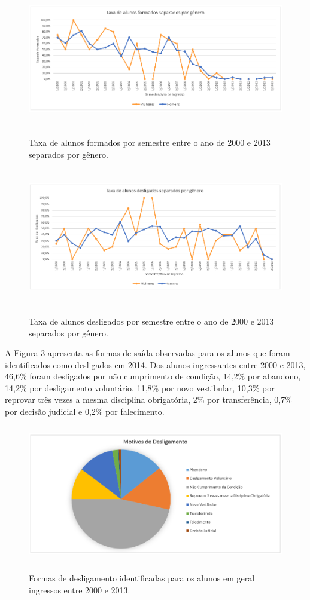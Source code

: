 \begin{figure}[!h]
	\centering
	{\includegraphics[width=16cm, height=6cm]{images/grafico5}}
	\caption {Taxa de alunos formados por semestre entre o ano de 2000 e 2013 separados por gênero.}
	\label{grafico5}
\end{figure}

\begin{figure}[!h]
	\centering
	{\includegraphics[width=16cm, height=6cm]{images/grafico6}}
	\caption {Taxa de alunos desligados por semestre entre o ano de 2000 e 2013 separados por gênero.}
	\label{grafico6}
\end{figure}


A Figura \ref{grafico8} apresenta as formas de saída observadas para os alunos que foram identificados como desligados em 2014. Dos alunos ingressantes entre 2000 e 2013, 46,6\% foram desligados por não cumprimento de condição, 14,2\% por abandono, 14,2\% por desligamento voluntário, 11,8\% por novo vestibular, 10,3\% por reprovar três vezes a mesma disciplina obrigatória, 2\% por transferência, 0,7\% por decisão judicial e 0,2\% por falecimento.

\begin{figure}[!h]
	\centering
	{\includegraphics[width=13cm, height=6cm]{images/grafico8}}
	\caption {Formas de desligamento identificadas para os alunos em geral ingressos entre 2000 e 2013.}
	\label{grafico8}
\end{figure}
 

